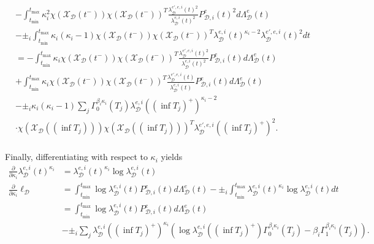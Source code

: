 \documentclass[honours,12pt]{unswthesis}
\numberwithin{equation}{section}
\begin{document}
\begin{equation*}
\begin{align}
		&- \int_{t_\mathrm{min}}^{t_\mathrm{max}} \kappa_i^2\chi(\mathcal{X}_\mathcal{D}(t^-)) \chi(\mathcal{X}_\mathcal{D}(t^-))^T \frac{\lambda_\mathcal{D}^{e',e,i}(t)^2}{\lambda_\mathcal{D}^{e,i}(t)^2} P_{\mathcal{D},i}^e(t)^2 d\Lambda_\mathcal{D}^e(t) \\
		&- \pm_i \int_{t_\mathrm{min}}^{t_\mathrm{max}} \kappa_i(\kappa_i-1)\chi(\mathcal{X}_\mathcal{D}(t^-)) \chi(\mathcal{X}_\mathcal{D}(t^-))^T  \lambda_\mathcal{D}^{e,i}(t)^{\kappa_i-2} \lambda_\mathcal{D}^{e',e,i}(t)^2 dt \\
		&= -\int_{t_\mathrm{min}}^{t_\mathrm{max}} \kappa_i\chi(\mathcal{X}_\mathcal{D}(t^-)) \chi(\mathcal{X}_\mathcal{D}(t^-))^T \frac{\lambda_\mathcal{D}^{e',e,i}(t)^2}{\lambda_\mathcal{D}^{e,i}(t)^2} P_{\mathcal{D},i}^e(t) d\Lambda_\mathcal{D}^e(t) \\
		&+ \int_{t_\mathrm{min}}^{t_\mathrm{max}} \kappa_i \chi(\mathcal{X}_\mathcal{D}(t^-)) \chi(\mathcal{X}_\mathcal{D}(t^-))^T \frac{\lambda_\mathcal{D}^{e',e,i}(t)}{\lambda_\mathcal{D}^{e,i}(t)} P_{\mathcal{D},i}^e(t) d\Lambda_\mathcal{D}^e(t) \\
		&- \pm_i \kappa_i(\kappa_i-1) \sum_j \Gamma_0^{\beta_i\kappa_i}(T_j)\lambda_\mathcal{D}^{e,i} ((\inf T_j)^+)^{\kappa_i-2} \\
		&\cdot \chi(\mathcal{X}_\mathcal{D}((\inf T_j))) \chi(\mathcal{X}_\mathcal{D}((\inf T_j)))^T \lambda_\mathcal{D}^{e',e,i}((\inf T_j)^+)^2. \\
	\end{align}
\end{equation*}

Finally, differentiating with respect to $\kappa_i$ yields
\begin{equation*}
	\begin{align}
		\frac{\partial}{\partial\kappa_i} \lambda_\mathcal{D}^{e,i}(t)^{\kappa_i} &= \lambda_\mathcal{D}^{e,i}(t)^{\kappa_i} \log\lambda_\mathcal{D}^{e,i}(t) \\
		\frac{\partial}{\partial\kappa_i} \ell_\mathcal{D} &= \int_{t_\mathrm{min}}^{t_\mathrm{max}} \log\lambda_\mathcal{D}^{e,i}(t) P_{\mathcal{D},i}^e(t) d\Lambda_\mathcal{D}^e(t) - \pm_i \int_{t_\mathrm{min}}^{t_\mathrm{max}} \lambda_\mathcal{D}^{e,i}(t)^{\kappa_i} \log\lambda_\mathcal{D}^{e,i}(t) dt \\
		&= \int_{t_\mathrm{min}}^{t_\mathrm{max}} \log\lambda_\mathcal{D}^{e,i}(t) P_{\mathcal{D},i}^e(t) d\Lambda_\mathcal{D}^e(t) \\
		&- \pm_i\sum_j \lambda_\mathcal{D}^{e,i}((\inf T_j)^+)^{\kappa_i} \left( \log\lambda_\mathcal{D}^{e,i}((\inf T_j)^+)\Gamma_0^{\beta_i\kappa_i}(T_j) - \beta_i \Gamma_1^{\beta_i\kappa_i}(T_j)\right). \\
	\end{align}
\end{equation*}
\end{document}
